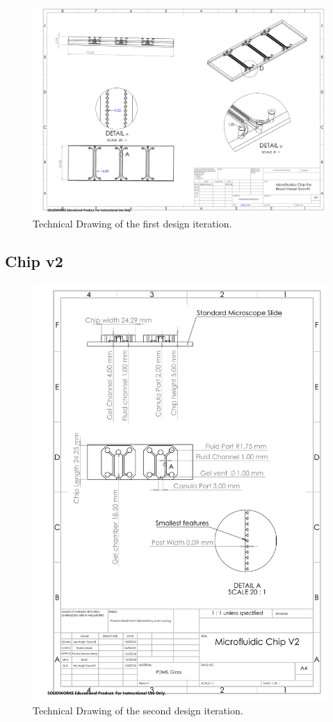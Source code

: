 \documentclass[letterpaper,12pt]{article}
\begin{document}
\begin{figure}[!h]
    \centering
    \includegraphics[width=1\linewidth]{PDF/TDV1.pdf}
    \caption{Technical Drawing of the first design iteration.}
    \label{fig:TDV1}
\end{figure}

\clearpage

\subsection{Chip v2}
\begin{figure}[!h]
    \centering
    \includegraphics[width=0.8\linewidth]{PDF/TDV2.pdf}
    \caption{Technical Drawing of the second design iteration.}
    \label{fig:TDV2}
\end{figure}
\end{document}
